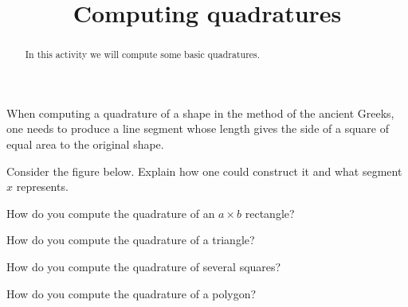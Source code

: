 \documentclass[space,handout]{ximera}
\title{Computing quadratures}
\begin{document}
\begin{abstract}
In this activity we will compute some basic quadratures.
\end{abstract}
\maketitle


When computing a quadrature of a shape in the method of the ancient
Greeks, one needs to produce a line segment whose length gives the
side of a square of equal area to the original shape.


\begin{question}
Consider the figure below. Explain how one could construct it and
what segment $x$ represents.
\begin{image}
\end{image}
\end{question}


\begin{question}
How do you compute the quadrature of an $a\times b$ rectangle?
\end{question}

\begin{question}
How do you compute the quadrature of a triangle?
\end{question}


\begin{question}
How do you compute the quadrature of several squares?
\end{question}


\begin{question}
How do you compute the quadrature of a polygon?
\end{question}
\end{document}
